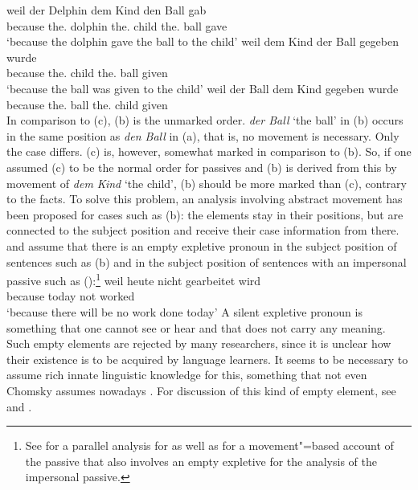 \eal
\label{ex-passive-German-no-movement}
\ex 
\gll weil der Delphin dem Kind den Ball gab\\
     because the.\NOM{} dolphin the.\DAT{} child the.\ACC{} ball gave\\
\glt `because the dolphin gave the ball to the child'
\ex 
\gll weil    dem        Kind  der        Ball gegeben wurde\\
     because the.\DAT{} child the.\NOM{} ball given \AUX\\
\glt `because the ball was given to the child'
\ex 
\gll weil    der        Ball dem        Kind  gegeben wurde\\
     because the.\NOM{} ball the.\DAT{} child given     \AUX\\
\zl
In comparison to (c), (b) is the unmarked order. \emph{der Ball} `the ball' in (b) occurs
in the same position as \emph{den Ball} in (a), that is, no movement is necessary. Only the case differs.
(c) is, however, somewhat marked in comparison to (b). So, if one assumed (c) to
be the normal order for passives and (b) is derived from this by movement of \emph{dem
  Kind} `the child', (b) should be more marked than (c), contrary to the
facts. To solve this problem, an analysis involving abstract movement has been proposed for
cases such as (b): the elements stay in their positions, but are connected to
the subject position and receive their case information from
there. \textcites[155--157]{Grewendorf88a}[]{Grewendorf93} and \citet[462--463]{SS88a}
assume that there is an empty expletive pronoun
in the subject position of sentences such as (b) and in the subject position of sentences with an
impersonal passive such as ():\footnote{%
	See  for a parallel analysis for  as well as 
	 for a movement"=based account of the passive that also involves an
        empty expletive for the analysis of the impersonal passive.
}
\ea
\gll weil    heute nicht gearbeitet wird\\
     because today not   worked     \AUX\\
\glt `because there will be no work done today'
\z
A silent expletive pronoun is something that one cannot see or hear and that does not carry any
meaning. Such empty elements are rejected by many researchers, since it is unclear how their
existence is to be acquired by language learners. It seems to be necessary to assume rich innate
linguistic knowledge for this, something that not even Chomsky assumes nowadays \citep*{HCF2002a}. For discussion of 
this kind of empty element, see  and .

